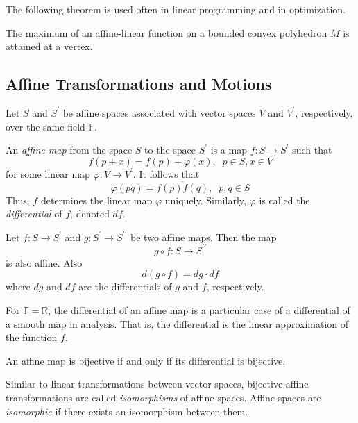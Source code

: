 \documentclass{article}
\begin{document}
    The following theorem is used often in linear programming and in optimization. 

    \begin{theorem}
    The maximum of an affine-linear function on a bounded convex polyhedron $M$ is attained at a vertex. 
    \end{theorem}

  \subsection{Affine Transformations and Motions}

    Let $S$ and $S^\prime$ be affine spaces associated with vector spaces $V$ and $V^\prime$, respectively, over the same field $\mathbb{F}$. 

    \begin{definition}
    An \textit{affine map} from the space $S$ to the space $S^\prime$ is a map $f: S \longrightarrow S^\prime$ such that
    \[f(p+x) = f(p) + \varphi(x), \;\; p \in S, x \in V\]
    for some linear map $\varphi: V \longrightarrow V^\prime$. It follows that
    \[\varphi(\overline{pq}) = \overline{f(p) f(q)}, \;\; p, q \in S\]
    Thus, $f$ determines the linear map $\varphi$ uniquely. Similarly, $\varphi$ is called the \textit{differential} of $f$, denoted $df$. 
    \end{definition}

    \begin{proposition}
    Let $f: S \longrightarrow S^\prime$ and $g: S^\prime \longrightarrow S^{\prime \prime}$ be two affine maps. Then the map
    \[g \circ f : S \longrightarrow S^{\prime\prime}\]
    is also affine. Also
    \[d(g \circ f) = dg \cdot df\]
    where $dg$ and $df$ are the differentials of $g$ and $f$, respectively. 
    \end{proposition}

    For $\mathbb{F} = \mathbb{R}$, the differential of an affine map is a particular case of a differential of a smooth map in analysis. That is, the differential is the linear approximation of the function $f$. 

    \begin{proposition}
    An affine map is bijective if and only if its differential is bijective. 
    \end{proposition}

    \begin{definition}
    Similar to linear transformations between vector spaces, bijective affine transformations are called \textit{isomorphisms} of affine spaces. Affine spaces are \textit{isomorphic} if there exists an isomorphism between them. 
    \end{definition}
\end{document}
